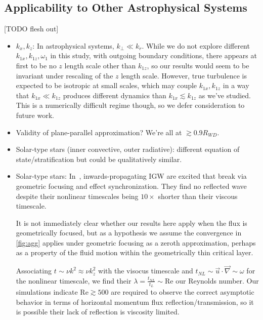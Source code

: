 \documentclass[
        fleqn,
        usenatbib,
    ]{mnras}
\begin{document}
\subsection{Applicability to Other Astrophysical Systems}

[TODO flesh out]

\begin{itemize}
    \item $k_x, k_z$: In astrophysical systems, $k_{\perp} \ll k_r$. While we do
        not explore different $k_{1x}, k_{1z}, \omega_1$ in this study, with
        outgoing boundary conditions, there appears at first to be no $z$ length
        scale other than $k_{1z}$, so our results would seem to be invariant
        under rescaling of the $z$ length scale. However, true turbulence is
        expected to be isotropic at small scales, which may couple $k_{1x},
        k_{1z}$ in a way that $k_{1x} \ll k_{1z}$ produces different dynamics
        than $k_{1x} \lesssim k_{1z}$ as we've studied. This is a numerically
        difficult regime though, so we defer consideration to future work.

    \item Validity of plane-parallel approximation? We're all at $\gtrsim
        0.9R_{WD}$.

    \item Solar-type stars (inner convective, outer radiative): different
        equation of state/stratification but could be qualitatively similar.

    \item Solar-type stars: In~\cite{barker_ogilvie}, inwards-propagating IGW
        are excited that break via geometric focusing and effect
        synchronization. They find no reflected wave despite their nonlinear
        timescales being $10\times$ shorter than their viscous timescale.

        It is not immediately clear whether our results here apply when the flux
        is geometrically focused, but as a hypothesis we assume the convergence
        in \autoref{fig:agg} applies under geometric focusing as a zeroth
        approximation, perhaps as a property of the fluid motion within the
        geometrically thin critical layer.

        Associating $t_{} \sim \nu k^2 \approx \nu k_z^2$ with the visocus
        timescale and $t_{NL} \sim \vec{u} \cdot \vec{\nabla} \sim \omega$ for
        the nonlinear timescale, we find their $\lambda = \frac{t_{NL}}{t_L}
        \sim \mathrm{Re}$ our Reynolds number. Our simulations indicate
        $\mathrm{Re} \gtrsim 500$ are required to observe the correct asymptotic
        behavior in terms of horizontal momentum flux reflection/transmission,
        so it is possible their lack of reflection is viscosity limited.
\end{itemize}
\end{document}
